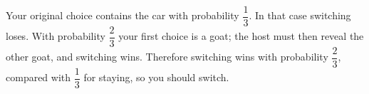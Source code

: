 Your original choice contains the car with probability $\dfrac{1}{3}$. In that case switching loses. With probability $\dfrac{2}{3}$ your first choice is a goat; the host must then reveal the other goat, and switching wins. Therefore switching wins with probability $\boxed{\dfrac{2}{3}}$, compared with $\dfrac{1}{3}$ for staying, so you should switch.
